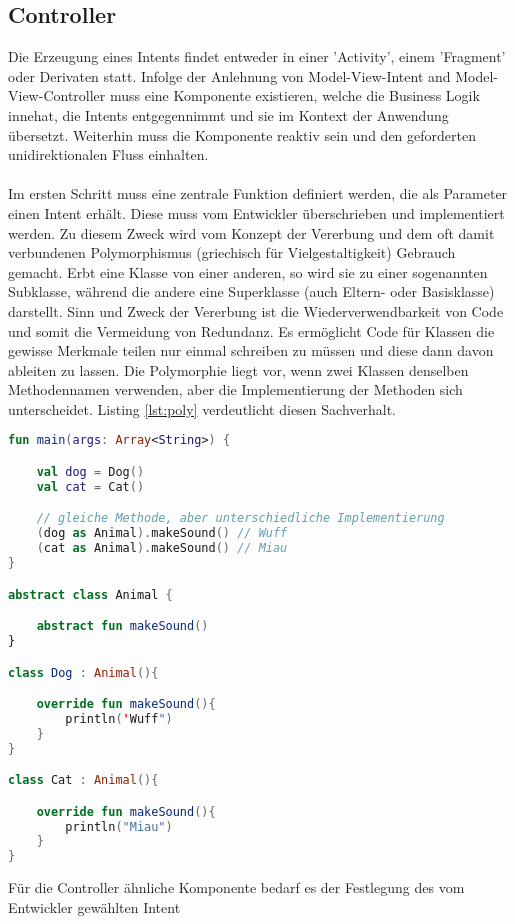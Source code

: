 \subsection{Controller}
Die Erzeugung eines Intents findet entweder in einer 'Activity', einem 'Fragment' oder Derivaten statt. 
Infolge der Anlehnung von Model-View-Intent and Model-View-Controller muss eine Komponente existieren, 
welche die Business Logik innehat, die Intents entgegennimmt und sie im Kontext der Anwendung übersetzt. 
Weiterhin muss die Komponente reaktiv sein und den geforderten unidirektionalen Fluss einhalten.
\\
\\
Im ersten Schritt muss eine zentrale Funktion definiert werden, die als Parameter einen Intent erhält.
Diese muss vom Entwickler überschrieben und implementiert werden.
Zu diesem Zweck wird vom Konzept der Vererbung und dem oft damit verbundenen Polymorphismus (griechisch 
für Vielgestaltigkeit) Gebrauch gemacht. Erbt eine Klasse von einer anderen, so wird sie zu einer 
sogenannten Subklasse, während die andere eine Superklasse (auch Eltern- oder Basisklasse) darstellt. 
Sinn und Zweck der Vererbung ist die Wiederverwendbarkeit von Code und somit die Vermeidung von 
Redundanz. Es ermöglicht Code für Klassen die gewisse Merkmale teilen nur einmal schreiben zu müssen und 
diese dann davon ableiten zu lassen. Die Polymorphie liegt vor, wenn  zwei Klassen denselben 
Methodennamen verwenden, aber die Implementierung der Methoden sich unterscheidet.
Listing 
\ref{lst:poly}
verdeutlicht diesen Sachverhalt.
\begin{lstlisting}[caption={Vererbung \& Polymorphismus}, label={lst:poly}, language=Kotlin]
fun main(args: Array<String>) {

	val dog = Dog()
	val cat = Cat()

	// gleiche Methode, aber unterschiedliche Implementierung
	(dog as Animal).makeSound() // Wuff
	(cat as Animal).makeSound() // Miau
}

abstract class Animal {

	abstract fun makeSound()
}

class Dog : Animal(){

	override fun makeSound(){
		println('Wuff")
	}
}

class Cat : Animal(){

	override fun makeSound(){
		println("Miau")
	}
}
\end{lstlisting}
\bigskip
Für die Controller ähnliche Komponente bedarf es der Festlegung des vom Entwickler gewählten Intent 
